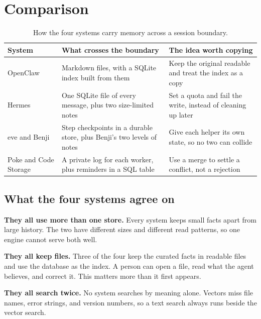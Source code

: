 \documentclass[11pt,a4paper]{article}
\renewcommand{\arraystretch}{1.25}
\begin{document}
\section{Comparison}

\begin{table}[H]
\centering
\caption[How the four systems carry memory]{How the four systems carry memory across a session boundary.}
\label{tab:cmp}
{\footnotesize
\renewcommand{\arraystretch}{1.3}
\begin{tabularx}{\textwidth}{L{1.8cm} X X}
\toprule
\sffamily\bfseries System & \sffamily\bfseries What crosses the boundary &
\sffamily\bfseries The idea worth copying \\
\midrule
OpenClaw & Markdown files, with a SQLite index built from them &
Keep the original readable and treat the index as a copy \\
Hermes & One SQLite file of every message, plus two size-limited notes &
Set a quota and fail the write, instead of cleaning up later \\
eve and Benji & Step checkpoints in a durable store, plus Benji's two
levels of notes & Give each helper its own state, so no two can collide \\
Poke and Code Storage & A private log for each worker, plus reminders in
a SQL table & Use a merge to settle a conflict, not a rejection \\
\bottomrule
\end{tabularx}}
\end{table}

\subsection{What the four systems agree on}

\textbf{They all use more than one store.} Every system keeps small
facts apart from large history. The two have different sizes and
different read patterns, so one engine cannot serve both well.

\textbf{They all keep files.} Three of the four keep the curated facts in
readable files and use the database as the index. A person can open a
file, read what the agent believes, and correct it. This matters more
than it first appears.

\textbf{They all search twice.} No system searches by meaning alone.
Vectors miss file names, error strings, and version numbers, so a text
search always runs beside the vector search.
\end{document}
